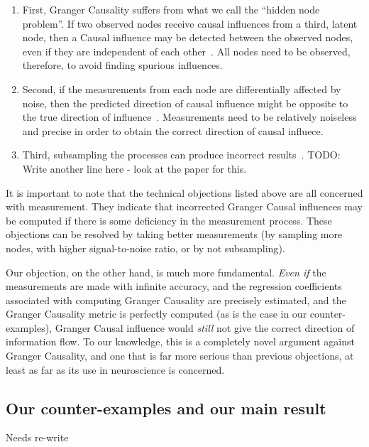 \documentclass[conference]{IEEEtran}
\begin{document}
\begin{enumerate}
	\item First, Granger Causality suffers from what we call the ``hidden node problem''. If two observed nodes receive causal influences from a third, latent node, then a Causal influence may be detected between the observed nodes, even if they are independent of each other~\cite{PearlCausalitychapterasdfads}. All nodes need to be observed, therefore, to avoid finding spurious influences.
	\item Second, if the measurements from each node are differentially affected by noise, then the predicted direction of causal influence might be opposite to the true direction of influence~\cite{Friston34234, EcoPaper3q4234}. Measurements need to be relatively noiseless and precise in order to obtain the correct direction of causal influece.
	\item Third, subsampling the processes can produce incorrect results~\cite{KunZhangsPaper}. {\color{red} TODO: Write another line here - look at the paper for this.}
\end{enumerate}

It is important to note that the technical objections listed above are all concerned with measurement. They indicate that incorrected Granger Causal influences may be computed if there is some deficiency in the measurement process. These objections can be resolved by taking better measurements (by sampling more nodes, with higher signal-to-noise ratio, or {\color{red} by not subsampling}).

Our objection, on the other hand, is much more fundamental. \emph{Even if} the measurements are made with infinite accuracy, and the regression coefficients associated with computing Granger Causality are precisely estimated, and the Granger Causality metric is perfectly computed (as is the case in our counter-examples), Granger Causal influence would \emph{still} not give the correct direction of information flow. To our knowledge, this is a completely novel argument against Granger Causality, and one that is far more serious than previous objections, at least as far as its use in neuroscience is concerned.

\subsection{Our counter-examples and our main result}

{\color{red} Needs re-write}
\end{document}
